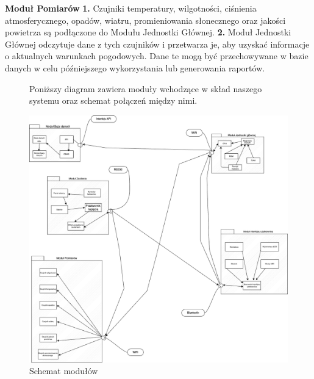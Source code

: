 \documentclass{article}
\begin{document}
\begin{flushleft}
    \Large \textbf{Moduł Pomiarów} \newline \newline
    \large
    \textbf{1.} Czujniki temperatury, wilgotności, ciśnienia atmosferycznego, opadów, wiatru, promieniowania słonecznego oraz jakości powietrza są podłączone do Modułu Jednostki Głównej. \newline \newline
    \textbf{2.} Moduł Jednostki Głównej odczytuje dane z tych czujników i przetwarza je, aby uzyskać informacje o aktualnych warunkach pogodowych. Dane te mogą być przechowywane w bazie danych w celu późniejszego wykorzystania lub generowania raportów. \newline \newline
\end{flushleft}
\begin{figure}
    \centering
    \begin{minipage}{0.6\textwidth}
        \centering
        \large Poniższy diagram zawiera moduły wchodzące w skład naszego systemu oraz schemat połączeń między nimi.
    \end{minipage}
    \includegraphics[scale=0.4]{moduły.png}
    \caption{Schemat modułów}
    \label{etykieta}
\end{figure}
\end{document}

